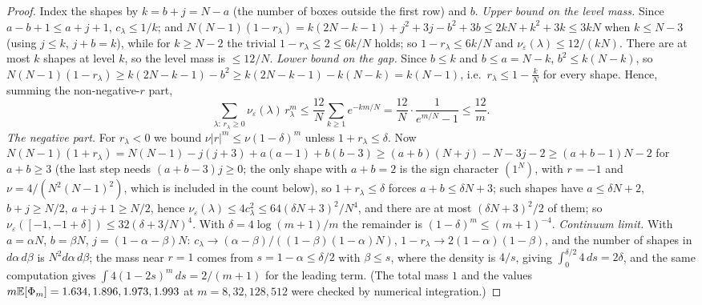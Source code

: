 \begin{proof}
Index the shapes by $k=b+j=N-a$ (the number of boxes outside the
first row) and $b$.  \emph{Upper bound on the level mass.}  Since
$a-b+1\le a+j+1$, $c_\lambda\le1/k$; and $N(N-1)(1-r_\lambda)
=k(2N-k-1)+j^2+3j-b^2+3b\le2kN+k^2+3k\le3kN$ when $k\le N-3$
(using $j\le k$, $j+b=k$), while for $k\ge N-2$ the trivial
$1-r_\lambda\le2\le6k/N$ holds; so $1-r_\lambda\le6k/N$ and
$\nu_\varepsilon(\lambda)\le12/(kN)$.  There are at most $k$ shapes at
level $k$, so the level mass is $\le12/N$.  \emph{Lower bound on the
gap.}  Since $b\le k$ and $b\le a=N-k$, $b^2\le k(N-k)$, so
$N(N-1)(1-r_\lambda)\ge k(2N-k-1)-b^2\ge k(2N-k-1)-k(N-k)=k(N-1)$,
i.e.\ $r_\lambda\le1-\frac kN$ for every shape.  Hence, summing the
non-negative-$r$ part,
\[
\sum_{\lambda:\,r_\lambda\ge0}\nu_\varepsilon(\lambda)\,r_\lambda^m
\le\frac{12}N\sum_{k\ge1}e^{-km/N}
=\frac{12}{N}\cdot\frac1{e^{m/N}-1}\le\frac{12}m .
\]
\emph{The negative part.}  For $r_\lambda<0$ we bound
$\nu|r|^m\le\nu(1-\delta)^m$ unless $1+r_\lambda\le\delta$.  Now
$N(N-1)(1+r_\lambda)=N(N-1)-j(j+3)+a(a-1)+b(b-3)\ge(a+b)(N+j)-N-3j-2
\ge(a+b-1)N-2$ for $a+b\ge3$ (the last step needs $(a+b-3)j\ge0$;
the only shape with $a+b=2$ is the sign character $(1^N)$, with
$r=-1$ and $\nu=4/(N^2(N-1)^2)$, which is included in the count
below), so $1+r_\lambda\le\delta$ forces $a+b\le\delta N+3$;
such shapes have $a\le\delta N+2$, $b+j\ge N/2$, $a+j+1\ge N/2$, hence
$\nu_\varepsilon(\lambda)\le4c_\lambda^2\le64(\delta N+3)^2/N^4$, and
there are at most $(\delta N+3)^2/2$ of them; so
$\nu_\varepsilon([-1,-1+\delta])\le32(\delta+3/N)^4$.  With
$\delta=4\log(m+1)/m$ the remainder is $(1-\delta)^m\le(m+1)^{-4}$.
\emph{Continuum limit.}  With $a=\alpha N$, $b=\beta N$,
$j=(1-\alpha-\beta)N$: $c_\lambda\to(\alpha-\beta)/((1-\beta)(1-\alpha)N)$,
$1-r_\lambda\to2(1-\alpha)(1-\beta)$, and the number of shapes in
$d\alpha\,d\beta$ is $N^2d\alpha\,d\beta$; the mass near $r=1$ comes
from $s=1-\alpha\le\delta/2$ with $\beta\le s$, where the density is
$4/s$, giving $\int_0^{\delta/2}4\,ds=2\delta$, and the same
computation gives $\int4(1-2s)^m\,ds=2/(m+1)$ for the leading term.
(The total mass $1$ and the values $m\mathbb{E}[\Phi_m]=1.634,1.896,1.973,
1.993$ at $m=8,32,128,512$ were checked by numerical integration.)
\end{proof}

